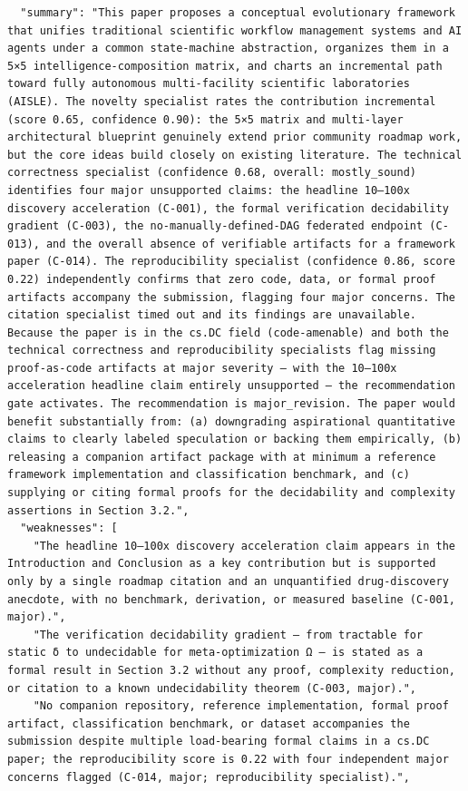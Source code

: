 \documentclass[11pt]{article}
\begin{document}
\begin{verbatim}
  "summary": "This paper proposes a conceptual evolutionary framework that unifies traditional scientific workflow management systems and AI agents under a common state-machine abstraction, organizes them in a 5×5 intelligence-composition matrix, and charts an incremental path toward fully autonomous multi-facility scientific laboratories (AISLE). The novelty specialist rates the contribution incremental (score 0.65, confidence 0.90): the 5×5 matrix and multi-layer architectural blueprint genuinely extend prior community roadmap work, but the core ideas build closely on existing literature. The technical correctness specialist (confidence 0.68, overall: mostly_sound) identifies four major unsupported claims: the headline 10–100x discovery acceleration (C-001), the formal verification decidability gradient (C-003), the no-manually-defined-DAG federated endpoint (C-013), and the overall absence of verifiable artifacts for a framework paper (C-014). The reproducibility specialist (confidence 0.86, score 0.22) independently confirms that zero code, data, or formal proof artifacts accompany the submission, flagging four major concerns. The citation specialist timed out and its findings are unavailable. Because the paper is in the cs.DC field (code-amenable) and both the technical correctness and reproducibility specialists flag missing proof-as-code artifacts at major severity — with the 10–100x acceleration headline claim entirely unsupported — the recommendation gate activates. The recommendation is major_revision. The paper would benefit substantially from: (a) downgrading aspirational quantitative claims to clearly labeled speculation or backing them empirically, (b) releasing a companion artifact package with at minimum a reference framework implementation and classification benchmark, and (c) supplying or citing formal proofs for the decidability and complexity assertions in Section 3.2.",
  "weaknesses": [
    "The headline 10–100x discovery acceleration claim appears in the Introduction and Conclusion as a key contribution but is supported only by a single roadmap citation and an unquantified drug-discovery anecdote, with no benchmark, derivation, or measured baseline (C-001, major).",
    "The verification decidability gradient — from tractable for static δ to undecidable for meta-optimization Ω — is stated as a formal result in Section 3.2 without any proof, complexity reduction, or citation to a known undecidability theorem (C-003, major).",
    "No companion repository, reference implementation, formal proof artifact, classification benchmark, or dataset accompanies the submission despite multiple load-bearing formal claims in a cs.DC paper; the reproducibility score is 0.22 with four independent major concerns flagged (C-014, major; reproducibility specialist).",

\end{verbatim}
\end{document}
